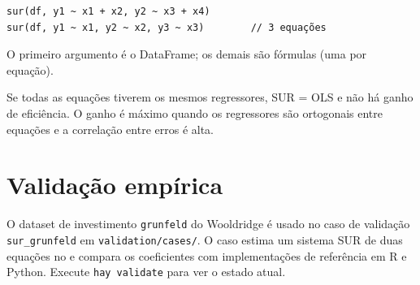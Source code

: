 \begin{lstlisting}
sur(df, y1 ~ x1 + x2, y2 ~ x3 + x4)
sur(df, y1 ~ x1, y2 ~ x2, y3 ~ x3)        // 3 equações
\end{lstlisting}

O primeiro argumento é o DataFrame; os demais são fórmulas (uma por equação).

\begin{nota}
  Se todas as equações tiverem os mesmos regressores, SUR = OLS e não há
  ganho de eficiência. O ganho é máximo quando os regressores são ortogonais
  entre equações e a correlação entre erros é alta.
\end{nota}

\section{Validação empírica}

O dataset de investimento \texttt{grunfeld} do Wooldridge é usado no caso de
validação \texttt{sur\_grunfeld} em \texttt{validation/cases/}. O caso estima um
sistema SUR de duas equações no \hayashi{} e compara os coeficientes com
implementações de referência em R e Python. Execute \lstinline{hay validate} para
ver o estado atual.
